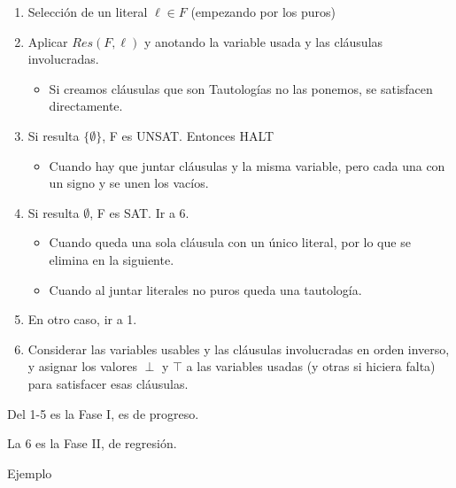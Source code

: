 \documentclass[12pt, twoside, openright]{report} %
\begin{document}
  \begin{enumerate}

  \item
    Selección de un literal \(\ell \in F\) (empezando por los puros)
  \item
    Aplicar \(Res(F,\ell)\) y anotando la variable usada y las cláusulas
    involucradas.

    \begin{itemize}
  
    \item
      Si creamos cláusulas que son Tautologías no las ponemos, se
      satisfacen directamente.
    \end{itemize}
  \item
    Si resulta $\{ \emptyset \}$, F es UNSAT. Entonces HALT

    \begin{itemize}
  
    \item
      Cuando hay que juntar cláusulas y la misma variable, pero cada una
      con un signo y se unen los vacíos.
    \end{itemize}
  \item
    Si resulta \(\emptyset\), F es SAT. Ir a 6.

    \begin{itemize}
  
    \item
      Cuando queda una sola cláusula con un único literal, por lo que se
      elimina en la siguiente.
    \item
      Cuando al juntar literales no puros queda una tautología.
    \end{itemize}
  \item
    En otro caso, ir a 1.
  \item
    Considerar las variables usables y las cláusulas involucradas en
    orden inverso, y asignar los valores \(\perp\) y \(\top\) a las
    variables usadas (y otras si hiciera falta) para satisfacer esas
    cláusulas.
  \end{enumerate}

    Del 1-5 es la Fase I, es de progreso.

	La 6 es la Fase II, de regresión.
\pagebreak
  
	Ejemplo
	
\end{document}
